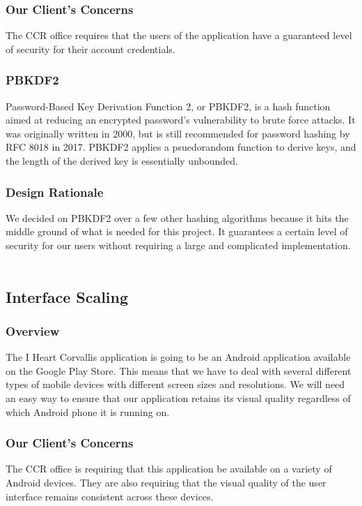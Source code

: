 \documentclass[draftclsnofoot, onecolumn, 10pt, compsoc]{IEEEtran}
\begin{document}
			\subsubsection{Our Client's Concerns}
				The CCR office requires that the users of the application have a guaranteed level of security for their account credentials.
			\subsubsection{PBKDF2}
				Password-Based Key Derivation Function 2, or PBKDF2, is a hash function aimed at reducing an encrypted password's vulnerability to brute force attacks. It was originally written in 2000, but is still recommended for password hashing by RFC 8018 in 2017. PBKDF2 applies a psuedorandom function to derive keys, and the length of the derived key is essentially unbounded.
				~\cite{PBKDF2}
				~\cite{PBKDF2_More}
			\subsubsection{Design Rationale}
				We decided on PBKDF2 over a few other hashing algorithms because it hits the middle ground of what is needed for this project. It guarantees a certain level of security for our users without requiring a large and complicated implementation. 
				~\cite{PBKDF2}
				
		\subsection{Interface Scaling}
			\subsubsection{Overview}
				The I Heart Corvallis application is going to be an Android application available on the Google Play Store. This means that we have to deal with several different types of mobile devices with different screen sizes and resolutions. We will need an easy way to ensure that our application retains its visual quality regardless of which Android phone it is running on.
			\subsubsection{Our Client's Concerns}
				The CCR office is requiring that this application be available on a variety of Android devices. They are also requiring that the visual quality of the user interface remains consistent across these devices.
\end{document}
